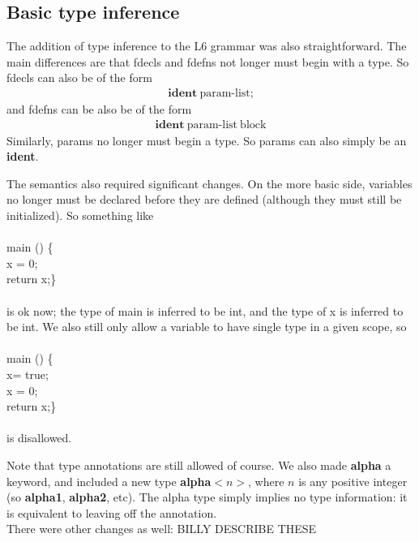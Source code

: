\documentclass{article}
\begin{document}
\subsection{Basic type inference}
The addition of type inference to the L6 grammar was also straightforward. The main differences are that fdecls and fdefns not longer must begin with a type. So fdecls can also be of the form
\begin{align*}
\textbf{ident} \ \textrm{param-list};
\end{align*}
and fdefns can be also be of the form
\begin{align*}
\textbf{ident} \ \textrm{param-list} \ \textrm{block}
\end{align*}
Similarly, params no longer must begin a type. So params can also simply be an \textbf{ident}.

The semantics also required significant changes. On the more basic side, variables no longer must be declared before they are defined (although they must still be initialized). So something like\\
\\
main () \{\\
 x = 0;\\
 return x;\}\\
 \\
is ok now; the type of main is inferred to be int, and the type of x is inferred to be int. We also still only allow a variable to have single type in a given scope, so\\
\\
main () \{\\
 x= true;\\
 x = 0;\\
 return x;\}\\
 \\
is disallowed. 

Note that type annotations are still allowed of course. We also made \textbf{alpha} a keyword, and included a new type \textbf{alpha}$<n>$, where $n$ is any positive integer (so \textbf{alpha1}, \textbf{alpha2}, etc). The alpha type simply implies no type information: it is equivalent to leaving off the annotation.\\

There were other changes as well: BILLY DESCRIBE THESE
\end{document}
